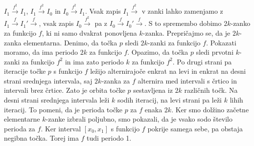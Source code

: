 \documentclass[../TG_magistrsko_delo_sections.tex]{subfiles}
\begin{document}
\begin{primer}[6-cikel]
$I_1 \xrightarrow{f^2} I_1$, $I_1 \xrightarrow{f^2} I_0$ in $I_0 \xrightarrow{f^2} I_1$. Vsak zapis $I_1 \xrightarrow{f^2}$ v zanki lahko zamenjamo z $I_1 \xrightarrow{f} I_1'  \xrightarrow{f}$, vsak zapis $I_0 \xrightarrow{f^2} $ pa z $I_0 \xrightarrow{f} I_0'  \xrightarrow{f}$. S to spremembo dobimo $2k$-zanko za funkcijo $f$, ki ni samo dvakrat ponovljena $k$-zanka. Prepričajmo se, da je $2k$-zanka elementarna. Denimo, da točka $p$ sledi $2k$-zanki za funkcijo $f$. Pokazati moramo, da ima periodo $2k$ za funkcijo $f$. Opazimo, da točka $p$ sledi prvotni $k$-zanki za funkcijo $f^2$ in ima zato periodo $k$ za funkcijo $f^2$. Po drugi strani pa iteracije točke $p$ s funkcijo $f$ ležijo alternirajoče enkrat na levi in enkrat na desni strani srednjega intervala, saj $2k$-zanka za $f$ alternira med intervali s črtico in intervali brez črtice. Zato je orbita točke $p$ sestavljena iz $2k$ različnih točk. Na desni strani srednjega intervala leži $k$ sodih iteracij, na levi strani pa leži $k$ lihih iteracij. To pomeni, da je perioda točke $p$ za $f$ enaka $2k$. Ker smo dolžino začetne elementarne $k$-zanke izbrali poljubno, smo pokazali, da je vsako sodo število perioda za $f$. Ker interval $[x_0, x_1]$ s funkcijo $f$ pokrije samega sebe, pa obstaja negibna točka. Torej ima $f$ tudi periodo 1. 
\end{primer}
\end{document}
